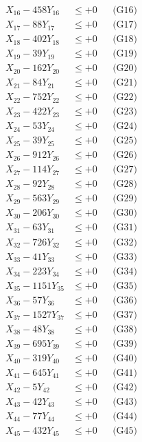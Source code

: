 \documentclass[a4paper,10pt]{article}
\begin{document}
{\begin{align}
X_{16} - 458Y_{16} &\leq +0 && \text{(G16)} \\
X_{17} - 88Y_{17} &\leq +0 && \text{(G17)} \\
X_{18} - 402Y_{18} &\leq +0 && \text{(G18)} \\
X_{19} - 39Y_{19} &\leq +0 && \text{(G19)} \\
X_{20} - 162Y_{20} &\leq +0 && \text{(G20)} \\
\allowbreak
X_{21} - 84Y_{21} &\leq +0 && \text{(G21)} \\
X_{22} - 752Y_{22} &\leq +0 && \text{(G22)} \\
X_{23} - 422Y_{23} &\leq +0 && \text{(G23)} \\
X_{24} - 53Y_{24} &\leq +0 && \text{(G24)} \\
X_{25} - 39Y_{25} &\leq +0 && \text{(G25)} \\
X_{26} - 912Y_{26} &\leq +0 && \text{(G26)} \\
X_{27} - 114Y_{27} &\leq +0 && \text{(G27)} \\
X_{28} - 92Y_{28} &\leq +0 && \text{(G28)} \\
X_{29} - 563Y_{29} &\leq +0 && \text{(G29)} \\
X_{30} - 206Y_{30} &\leq +0 && \text{(G30)} \\
\allowbreak
X_{31} - 63Y_{31} &\leq +0 && \text{(G31)} \\
X_{32} - 726Y_{32} &\leq +0 && \text{(G32)} \\
X_{33} - 41Y_{33} &\leq +0 && \text{(G33)} \\
X_{34} - 223Y_{34} &\leq +0 && \text{(G34)} \\
X_{35} - 1151Y_{35} &\leq +0 && \text{(G35)} \\
X_{36} - 57Y_{36} &\leq +0 && \text{(G36)} \\
X_{37} - 1527Y_{37} &\leq +0 && \text{(G37)} \\
X_{38} - 48Y_{38} &\leq +0 && \text{(G38)} \\
X_{39} - 695Y_{39} &\leq +0 && \text{(G39)} \\
X_{40} - 319Y_{40} &\leq +0 && \text{(G40)} \\
\allowbreak
X_{41} - 645Y_{41} &\leq +0 && \text{(G41)} \\
X_{42} - 5Y_{42} &\leq +0 && \text{(G42)} \\
X_{43} - 42Y_{43} &\leq +0 && \text{(G43)} \\
X_{44} - 77Y_{44} &\leq +0 && \text{(G44)} \\
X_{45} - 432Y_{45} &\leq +0 && \text{(G45)} \\

\end{align}}
\end{document}

